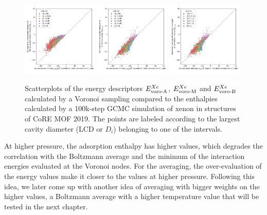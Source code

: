 \documentclass[main]{subfiles}
\begin{document}
\begin{figure}[ht]
    \centering
      \includegraphics[width=0.32\textwidth]{figures/3-fastsim/H_Xe_2080_vs_E_voro_A_overview.jpg}
      \includegraphics[width=0.32\textwidth]{figures/3-fastsim/H_Xe_2080_vs_E_voro_M_overview.jpg}
      \includegraphics[width=0.32\textwidth]{figures/3-fastsim/H_Xe_2080_vs_E_voro_B_overview.jpg}
      \caption{Scatterplots of the energy descriptors $E_{\text{voro-A}}^{Xe}$, $E_{\text{voro-M}}^{Xe}$ and $E_{\text{voro-B}}^{Xe}$ calculated by a Voronoi sampling compared to the enthalpies calculated by a 100k-step GCMC simulation of xenon in structures of CoRE MOF 2019. The points are labeled according to the largest cavity diameter (LCD or $D_i$) belonging to one of the intervals.}\label{fgr:compa_voro_2080}
  \end{figure}
  
At higher pressure, the adsorption enthalpy has higher values, which degrades the correlation with the Boltzmann average and the minimum of the interaction energies evaluated at the Voronoi nodes. For the averaging, the over-evaluation of the energy values make it closer to the values at higher pressure. Following this idea, we later come up with another idea of averaging with bigger weights on the higher values, a Boltzmann average with a higher temperature value that will be tested in the next chapter. 
\end{document}
